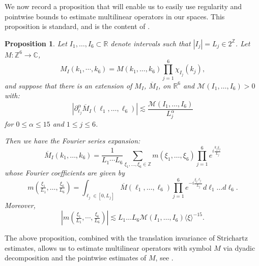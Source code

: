 \documentclass[12pt, letterpaper]{amsart}
\newtheorem{proposition}{Proposition}
\newcommand{\cal}[1]{\mathcal{#1}}
\begin{document}
We now record a proposition that will enable us to easily use regularity and pointwise bounds to estimate multilinear operators in our spaces. This proposition is standard, and is the content of \cite[Proposition 5.4]{schippa2024improved}.
\begin{proposition}\label{Proposition: Regularity}
    Let $I_1,\dots, I_6\subset \mathbb{R}$ denote intervals such that $|I_j| = L_j\in 2^\mathbb{Z}$. Let $M:\mathbb{Z}^6\to\mathbb{C}$, 
    \[
    M_I(k_1,\cdots, k_6) = M(k_1,\dots, k_6)\prod_{j=1}^6\chi_{I_j}(k_j),
    \]
    and suppose that there is an extension of $M_I$, $\overline{M}_I$, on $\mathbb{R}^6$ and $\cal{M}(I_1,\dots, I_6)>0$ with:
    \begin{equation}\label{Equation: Regularity}
        |\partial_{\ell_j}^\alpha \overline{M}_I(\ell_1,\dots,\ell_6)|\lesssim \frac{\cal{M}(I_1,\dots,I_6)}{L^\alpha_j}
    \end{equation}
    for $0 \leq \alpha \leq 15$ and $1\leq j\leq 6$.

    Then we have the Fourier series expansion:
    \begin{equation}
        \overline{M}_I(k_1,\dots, k_6) = \frac{1}{L_1\cdots L_6}\sum_{\xi_1,\dots, \xi_6\in\mathbb{Z}}m(\xi_1,\dots,\xi_6)\prod_{j=1}^6e^{i\frac{k_j\xi_j}{L_j}}
    \end{equation}
    whose Fourier coefficients are given by
    \begin{equation}
        m(\tfrac{\xi_1}{L_1},\dots,\tfrac{\xi_6}{L_6}) = \int_{\ell_j\in [0,L_j]}\overline{M}(\ell_1,\dots,\ell_6)\prod_{j=1}^6e^{-i\frac{\xi_j\ell_j}{L_j}}d\ell_1\dots d\ell_6.
    \end{equation}
    Moreover, 
    \begin{equation}
        |m(\tfrac{\xi_1}{L_1},\cdots,\tfrac{\xi_6}{L_6})|\lesssim L_1\dots L_6 \cal{M}(I_1,\dots, I_6)\langle \xi\rangle^{-15}.
    \end{equation}
\end{proposition}
The above proposition, combined with the translation invariance of Strichartz estimates, allows us to estimate multilinear operators with symbol $M$ via dyadic decomposition and the pointwise estimates of $M$, see \cite[Remark 5.5]{schippa2024improved}.
\end{document}
